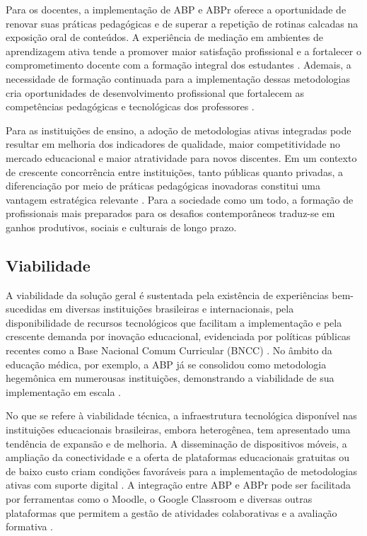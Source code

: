 Para os docentes, a implementação de ABP e ABPr oferece a oportunidade de renovar suas práticas pedagógicas e de superar a repetição de rotinas calcadas na exposição oral de conteúdos. A experiência de mediação em ambientes de aprendizagem ativa tende a promover maior satisfação profissional e a fortalecer o comprometimento docente com a formação integral dos estudantes \cite{MIRANDA2022}. Ademais, a necessidade de formação continuada para a implementação dessas metodologias cria oportunidades de desenvolvimento profissional que fortalecem as competências pedagógicas e tecnológicas dos professores \cite{CANTANHEDE2026}.

Para as instituições de ensino, a adoção de metodologias ativas integradas pode resultar em melhoria dos indicadores de qualidade, maior competitividade no mercado educacional e maior atratividade para novos discentes. Em um contexto de crescente concorrência entre instituições, tanto públicas quanto privadas, a diferenciação por meio de práticas pedagógicas inovadoras constitui uma vantagem estratégica relevante \cite{PORTER1980}. Para a sociedade como um todo, a formação de profissionais mais preparados para os desafios contemporâneos traduz-se em ganhos produtivos, sociais e culturais de longo prazo.

\subsection{Viabilidade}
\label{subsec:jg_viabilidade}

A viabilidade da solução geral é sustentada pela existência de experiências bem-sucedidas em diversas instituições brasileiras e internacionais, pela disponibilidade de recursos tecnológicos que facilitam a implementação e pela crescente demanda por inovação educacional, evidenciada por políticas públicas recentes como a Base Nacional Comum Curricular (BNCC) \cite{BRASIL2018}. No âmbito da educação médica, por exemplo, a ABP já se consolidou como metodologia hegemônica em numerousas instituições, demonstrando a viabilidade de sua implementação em escala \cite{GOMES2009}.

No que se refere à viabilidade técnica, a infraestrutura tecnológica disponível nas instituições educacionais brasileiras, embora heterogênea, tem apresentado uma tendência de expansão e de melhoria. A disseminação de dispositivos móveis, a ampliação da conectividade e a oferta de plataformas educacionais gratuitas ou de baixo custo criam condições favoráveis para a implementação de metodologias ativas com suporte digital \cite{MEZZARI2011}. A integração entre ABP e ABPr pode ser facilitada por ferramentas como o Moodle, o Google Classroom e diversas outras plataformas que permitem a gestão de atividades colaborativas e a avaliação formativa \cite{RIBEIRO2023}.

